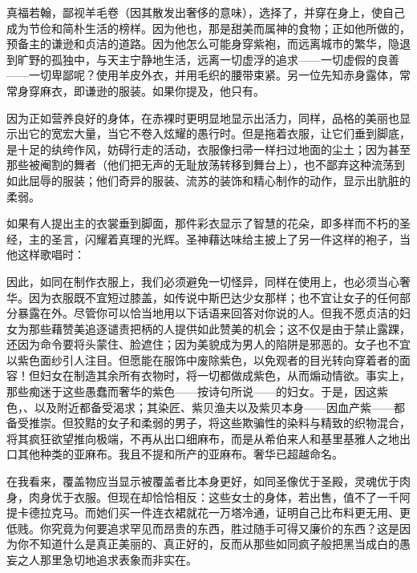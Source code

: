 真福若翰，鄙视羊毛卷（因其散发出奢侈的意味），选择了，并穿在身上，使自己成为节俭和简朴生活的榜样。因为他也，那是甜美而属神的食物；正如他所做的，预备主的谦逊和贞洁的道路。因为他怎么可能身穿紫袍，而远离城市的繁华，隐退到旷野的孤独中，与天主宁静地生活，远离一切虚浮的追求——一切虚假的良善——一切卑鄙呢？使用羊皮外衣，并用毛织的腰带束紧。另一位先知赤身露体，常常身穿麻衣，即谦逊的服装。如果你提及，他只有。\par

因为正如营养良好的身体，在赤裸时更明显地显示出活力，同样，品格的美丽也显示出它的宽宏大量，当它不卷入炫耀的愚行时。但是拖着衣服，让它们垂到脚底，是十足的纨绔作风，妨碍行走的活动，衣服像扫帚一样扫过地面的尘土；因为甚至那些被阉割的舞者（他们把无声的无耻放荡转移到舞台上），也不鄙弃这种流荡到如此屈辱的服装；他们奇异的服装、流苏的装饰和精心制作的动作，显示出肮脏的柔弱。\par

如果有人提出主的衣裳垂到脚面，那件彩衣显示了智慧的花朵，即多样而不朽的圣经，主的圣言，闪耀着真理的光辉。圣神藉达味给主披上了另一件这样的袍子，当他这样歌唱时：\par

因此，如同在制作衣服上，我们必须避免一切怪异，同样在使用上，也必须当心奢华。因为衣服既不宜短过膝盖，如传说中斯巴达少女那样；也不宜让女子的任何部分暴露在外。尽管你可以恰当地用以下话语来回答对你说的人。但我不愿贞洁的妇女为那些藉赞美追逐谴责把柄的人提供如此赞美的机会；这不仅是由于禁止露踝，还因为命令要将头蒙住、脸遮住；因为美貌成为男人的陷阱是邪恶的。女子也不宜以紫色面纱引人注目。但愿能在服饰中废除紫色，以免观者的目光转向穿着者的面容！但妇女在制造其余所有衣物时，将一切都做成紫色，从而煽动情欲。事实上，那些痴迷于这些愚蠢而奢华的紫色——按诗句所说——的妇女。于是，因这紫色，、以及附近都备受渴求；其染匠、紫贝渔夫以及紫贝本身——因血产紫——都备受推崇。但狡黠的女子和柔弱的男子，将这些欺骗性的染料与精致的织物混合，将其疯狂欲望推向极端，不再从出口细麻布，而是从希伯来人和基里基雅人之地出口其他种类的亚麻布。我且不提和所产的亚麻布。奢华已超越命名。\par

在我看来，覆盖物应当显示被覆盖者比本身更好，如同圣像优于圣殿，灵魂优于肉身，肉身优于衣服。但现在却恰恰相反：这些女士的身体，若出售，值不了一千阿提卡德拉克马。而她们买一件连衣裙就花一万塔冷通，证明自己比布料更无用、更低贱。你究竟为何要追求罕见而昂贵的东西，胜过随手可得又廉价的东西？这是因为你不知道什么是真正美丽的、真正好的，反而从那些如同疯子般把黑当成白的愚妄之人那里急切地追求表象而非实在。\par


